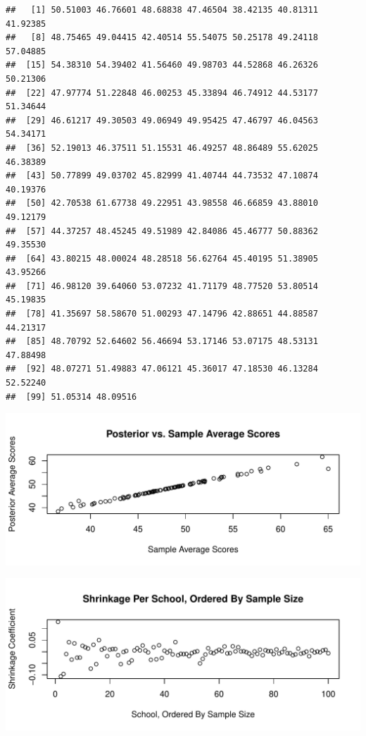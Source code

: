 \documentclass[12pt,letterpaper]{article}\usepackage[]{graphicx}\usepackage[]{color}
\makeatletter
\def\maxwidth{ %
  \ifdim\Gin@nat@width>\linewidth
    \linewidth
  \else
    \Gin@nat@width
  \fi
}
\newenvironment{kframe}{%
 \def\at@end@of@kframe{}%
 \ifinner\ifhmode%
  \def\at@end@of@kframe{\end{minipage}}%
  \begin{minipage}{\columnwidth}%
 \fi\fi%
 \def\FrameCommand##1{\hskip\@totalleftmargin \hskip-\fboxsep
 \colorbox{shadecolor}{##1}\hskip-\fboxsep
     \hskip-\linewidth \hskip-\@totalleftmargin \hskip\columnwidth}%
 \MakeFramed {\advance\hsize-\width
   \@totalleftmargin\z@ \linewidth\hsize
   \@setminipage}}%
 {\par\unskip\endMakeFramed%
 \at@end@of@kframe}
\newenvironment{knitrout}{}{} %
\makeatother
\begin{document}
\begin{knitrout}
\color{fgcolor}\begin{kframe}
\begin{verbatim}
##   [1] 50.51003 46.76601 48.68838 47.46504 38.42135 40.81311 41.92385
##   [8] 48.75465 49.04415 42.40514 55.54075 50.25178 49.24118 57.04885
##  [15] 54.38310 54.39402 41.56460 49.98703 44.52868 46.26326 50.21306
##  [22] 47.97774 51.22848 46.00253 45.33894 46.74912 44.53177 51.34644
##  [29] 46.61217 49.30503 49.06949 49.95425 47.46797 46.04563 54.34171
##  [36] 52.19013 46.37511 51.15531 46.49257 48.86489 55.62025 46.38389
##  [43] 50.77899 49.03702 45.82999 41.40744 44.73532 47.10874 40.19376
##  [50] 42.70538 61.67738 49.22951 43.98558 46.66859 43.88010 49.12179
##  [57] 44.37257 48.45245 49.51989 42.84086 45.46777 50.88362 49.35530
##  [64] 43.80215 48.00024 48.28518 56.62764 45.40195 51.38905 43.95266
##  [71] 46.98120 39.64060 53.07232 41.71179 48.77520 53.80514 45.19835
##  [78] 41.35697 58.58670 51.00293 47.14796 42.88651 44.88587 44.21317
##  [85] 48.70792 52.64602 56.46694 53.17146 53.07175 48.53131 47.88498
##  [92] 48.07271 51.49883 47.06121 45.36017 47.18530 46.13284 52.52240
##  [99] 51.05314 48.09516
\end{verbatim}
\end{kframe}
\includegraphics[width=\maxwidth]{figure/unnamed-chunk-2-1} 

\includegraphics[width=\maxwidth]{figure/unnamed-chunk-2-2} 


\end{knitrout}
\end{document}
